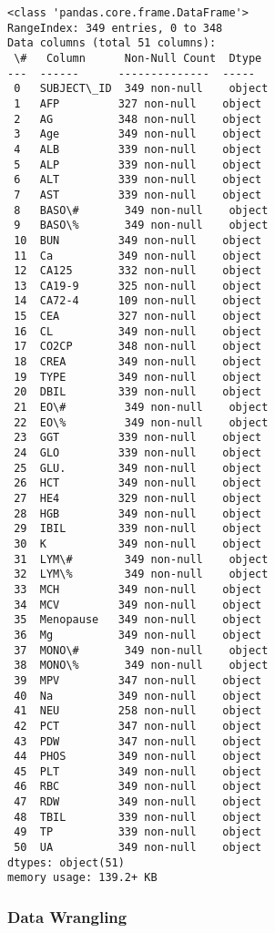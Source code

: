 \documentclass[11pt]{article}
\begin{document}
    \begin{Verbatim}[commandchars=\\\{\}]
<class 'pandas.core.frame.DataFrame'>
RangeIndex: 349 entries, 0 to 348
Data columns (total 51 columns):
 \#   Column      Non-Null Count  Dtype
---  ------      --------------  -----
 0   SUBJECT\_ID  349 non-null    object
 1   AFP         327 non-null    object
 2   AG          348 non-null    object
 3   Age         349 non-null    object
 4   ALB         339 non-null    object
 5   ALP         339 non-null    object
 6   ALT         339 non-null    object
 7   AST         339 non-null    object
 8   BASO\#       349 non-null    object
 9   BASO\%       349 non-null    object
 10  BUN         349 non-null    object
 11  Ca          349 non-null    object
 12  CA125       332 non-null    object
 13  CA19-9      325 non-null    object
 14  CA72-4      109 non-null    object
 15  CEA         327 non-null    object
 16  CL          349 non-null    object
 17  CO2CP       348 non-null    object
 18  CREA        349 non-null    object
 19  TYPE        349 non-null    object
 20  DBIL        339 non-null    object
 21  EO\#         349 non-null    object
 22  EO\%         349 non-null    object
 23  GGT         339 non-null    object
 24  GLO         339 non-null    object
 25  GLU.        349 non-null    object
 26  HCT         349 non-null    object
 27  HE4         329 non-null    object
 28  HGB         349 non-null    object
 29  IBIL        339 non-null    object
 30  K           349 non-null    object
 31  LYM\#        349 non-null    object
 32  LYM\%        349 non-null    object
 33  MCH         349 non-null    object
 34  MCV         349 non-null    object
 35  Menopause   349 non-null    object
 36  Mg          349 non-null    object
 37  MONO\#       349 non-null    object
 38  MONO\%       349 non-null    object
 39  MPV         347 non-null    object
 40  Na          349 non-null    object
 41  NEU         258 non-null    object
 42  PCT         347 non-null    object
 43  PDW         347 non-null    object
 44  PHOS        349 non-null    object
 45  PLT         349 non-null    object
 46  RBC         349 non-null    object
 47  RDW         349 non-null    object
 48  TBIL        339 non-null    object
 49  TP          339 non-null    object
 50  UA          349 non-null    object
dtypes: object(51)
memory usage: 139.2+ KB
    \end{Verbatim}

    \subsubsection{\texorpdfstring{Data Wrangling
}{Data Wrangling }}\label{data-wrangling}
\end{document}
